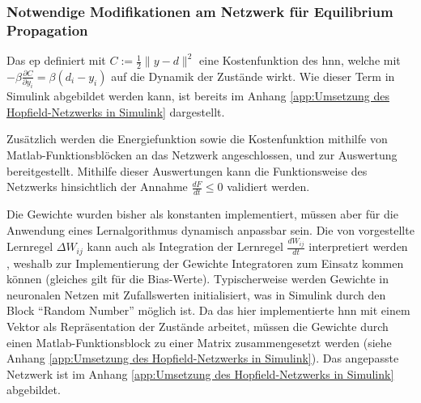 \subsubsection{Notwendige Modifikationen am Netzwerk für Equilibrium Propagation}

Das \ac{ep} definiert mit \(C:=\frac{1}{2}\| y-d\| ^2\) eine Kostenfunktion des \ac{hnn}, welche mit \(-\beta\frac{\partial C}{\partial y_i}=\beta(d_i-y_i)\) auf die Dynamik der Zustände wirkt. Wie dieser Term in Simulink abgebildet werden kann, ist bereits im Anhang \ref{app:Umsetzung des Hopfield-Netzwerks in Simulink} dargestellt.

Zusätzlich werden die Energiefunktion sowie die Kostenfunktion mithilfe von Matlab-Funktionsblöcken an das Netzwerk angeschlossen, und zur Auswertung bereitgestellt. Mithilfe dieser Auswertungen kann die Funktionsweise des Netzwerks hinsichtlich der Annahme \(\frac{dF}{dt}\leq{0}\) \cite[vgl. S. 3]{Scellier2017} validiert werden.

Die Gewichte wurden bisher als konstanten implementiert, müssen aber für die Anwendung eines Lernalgorithmus dynamisch anpassbar sein. Die von \citeauthor{Scellier2017} vorgestellte Lernregel \(\Delta W_{ij}\) kann auch als Integration der Lernregel \(\frac{dW_{ij}}{dt}\) interpretiert werden \cite[vgl. S. 5]{Scellier2017}, weshalb zur Implementierung der Gewichte Integratoren zum Einsatz kommen können (gleiches gilt für die Bias-Werte). Typischerweise werden Gewichte in neuronalen Netzen mit Zufallswerten initialisiert, was in Simulink durch den Block "`Random Number"' möglich ist. Da das hier implementierte \ac{hnn} mit einem Vektor als Repräsentation der Zustände arbeitet, müssen die Gewichte durch einen Matlab-Funktionsblock zu einer Matrix zusammengesetzt werden (siehe Anhang \ref{app:Umsetzung des Hopfield-Netzwerks in Simulink}). Das angepasste Netzwerk ist im Anhang \ref{app:Umsetzung des Hopfield-Netzwerks in Simulink} abgebildet.
